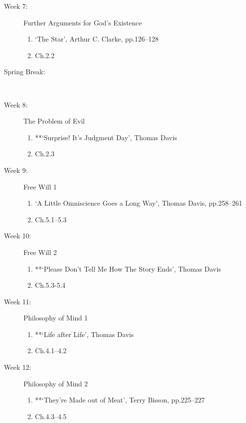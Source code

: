 \documentclass[article,oneside]{memoir}
\begin{document}
\begin{description}
\item[Week 7:] Further Arguments for God's Existence
\begin{enumerate}
\item `The Star', Arthur C. Clarke, pp.126--128
\item Ch.2.2
\end{enumerate}

\item[Spring Break:]\

\item[Week 8:] The Problem of Evil 
\begin{enumerate}
\item **`Surprise! It's Judgment Day', Thomas Davis
\item Ch.2.3
\end{enumerate}



\item[Week 9:] Free Will 1
\begin{enumerate}
\item `A Little Omniscience Goes a Long Way', Thomas Davis, pp.258--261
\item Ch.5.1--5.3
\end{enumerate}

\item[Week 10:] Free Will 2
\begin{enumerate}
\item **`Please Don't Tell Me How The Story Ends', Thomas Davis
\item Ch.5.3-5.4
\end{enumerate}


\item[Week 11:] Philosophy of Mind 1
\begin{enumerate}
\item **`Life after Life', Thomas Davis
\item Ch.4.1--4.2
\end{enumerate}


\item[Week 12:] Philosophy of Mind 2
\begin{enumerate}
\item **`They're Made out of Meat', Terry Bisson, pp.225--227
\item Ch.4.3--4.5
\end{enumerate}


\end{description}
\end{document}
